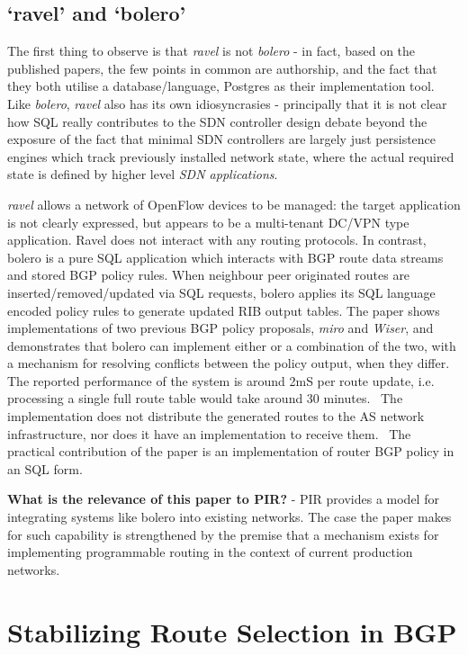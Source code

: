 \subsection{`ravel' and `bolero'}

The first thing to observe is that \textit{ravel} is not \textit{bolero} -
in fact, based on the published papers,
the few points in common are authorship, and the fact that they both utilise a
database/language, Postgres as their implementation tool.
Like \textit{bolero},	\textit{ravel} also has its own idiosyncrasies -
principally that it is not
clear how SQL really contributes to the SDN controller design debate beyond
the	exposure of the fact that minimal SDN controllers are largely just
persistence engines which track previously installed network state,
where the actual required state is defined by higher level \textit{SDN applications}.

\textit{ravel} allows a network of OpenFlow devices to be managed: the target
application is not clearly expressed, but appears to be a multi-tenant DC/VPN
type application.
Ravel does not interact with any routing protocols.
In contrast, bolero is a pure SQL application which interacts with BGP route data
streams and stored BGP policy rules.
When neighbour peer originated routes are inserted/removed/updated via SQL requests,
bolero applies its SQL language
encoded policy rules to generate updated RIB output tables.
The paper shows implementations of two previous BGP policy proposals,
\textit{miro}\cite{miro} and \textit{Wiser}\cite{Mahajan2007},
and demonstrates that bolero can implement either or a combination of the two,
with a mechanism for resolving conflicts between the policy output, when they differ.
The reported performance of the system is around 2mS per route update,
i.e. processing a single full route table would take around 30 minutes.
~The implementation does not distribute the generated routes to the AS network infrastructure,
nor does it have an implementation to receive them.
~The practical contribution of the paper is an implementation of router BGP policy in an SQL form.

\textbf{What is the relevance of this paper to PIR?}
- PIR provides a model for integrating systems like bolero into existing networks.
The case the paper makes for such capability is strengthened by the
premise that a mechanism exists for implementing programmable routing in the
context of current production networks.

\section{Stabilizing Route Selection in BGP }


